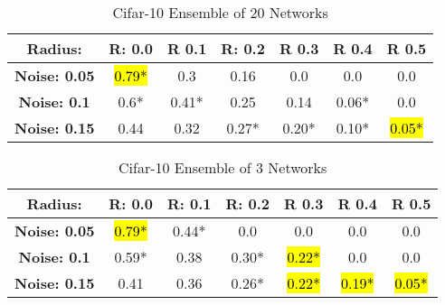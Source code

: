 \documentclass{article}
\begin{document}
\begin{table}[htb]
    \centering
    \begin{tabular}{|c|c|c|c|c|c|c|} \hline 
        
        \textbf{Radius: } & \textbf{R: 0.0} & \textbf{R 0.1} & \textbf{R: 0.2} & \textbf{R 0.3} & \textbf{R 0.4} & \textbf{R 0.5} \\ \hline 
        
        \textbf{Noise: 0.05} & \hl{0.79*} & 0.3 & 0.16 & 0.0 & 0.0 & 0.0 \\ \hline 
        
        \textbf{Noise: 0.1} & 0.6* & 0.41* & 0.25 & 0.14 & 0.06* & 0.0 \\ \hline

        \textbf{Noise: 0.15} & 0.44 & 0.32 & 0.27* & 0.20* & 0.10* & \hl{0.05*} \\ \hline
        
    \end{tabular}
    \caption{Cifar-10 Ensemble of 20 Networks}
    \label{tab:example}
\end{table}


\begin{table}[htb]
    \centering
    \begin{tabular}{|c|c|c|c|c|c|c|} \hline 
        
        \textbf{Radius: } & \textbf{R: 0.0} & \textbf{R: 0.1} & \textbf{R: 0.2} & \textbf{R 0.3} & \textbf{R 0.4} & \textbf{R 0.5} \\ \hline 
        
        \textbf{Noise: 0.05} & \hl{0.79*} & 0.44* & 0.0 & 0.0 & 0.0 & 0.0 \\ \hline 
        
        \textbf{Noise: 0.1} & 0.59* & 0.38 & 0.30* & \hl{0.22*} & 0.0 & 0.0 \\ \hline

        \textbf{Noise: 0.15} & 0.41 & 0.36 & 0.26* & \hl{0.22*} & \hl{0.19*} & \hl{0.05*} \\ \hline
        
    \end{tabular}
    \caption{Cifar-10 Ensemble of 3 Networks}
    \label{tab:example}
\end{table}
\end{document}
